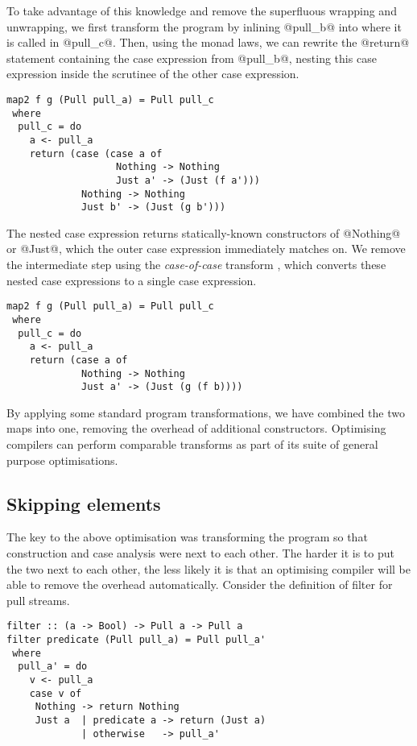 To take advantage of this knowledge and remove the superfluous wrapping and unwrapping, we first transform the program by inlining @pull_b@ into where it is called in @pull_c@.
Then, using the monad laws, we can rewrite the @return@ statement containing the case expression from @pull_b@, nesting this case expression inside the scrutinee of the other case expression.

\begin{lstlisting}
map2 f g (Pull pull_a) = Pull pull_c
 where
  pull_c = do
    a <- pull_a
    return (case (case a of
                   Nothing -> Nothing
                   Just a' -> (Just (f a')))
             Nothing -> Nothing
             Just b' -> (Just (g b')))
\end{lstlisting}

The nested case expression returns statically-known constructors of @Nothing@ or @Just@, which the outer case expression immediately matches on.
We remove the intermediate step using the \emph{case-of-case} transform \cite{jones1998transformation}, which converts these nested case expressions to a single case expression.


\begin{lstlisting}
map2 f g (Pull pull_a) = Pull pull_c
 where
  pull_c = do
    a <- pull_a
    return (case a of
             Nothing -> Nothing
             Just a' -> (Just (g (f b))))
\end{lstlisting}

By applying some standard program transformations, we have combined the two maps into one, removing the overhead of additional constructors.
Optimising compilers can perform comparable transforms as part of its suite of general purpose optimisations.

\subsection{Skipping elements}

The key to the above optimisation was transforming the program so that construction and case analysis were next to each other.
The harder it is to put the two next to each other, the less likely it is that an optimising compiler will be able to remove the overhead automatically.
Consider the definition of filter for pull streams.

\begin{lstlisting}
filter :: (a -> Bool) -> Pull a -> Pull a
filter predicate (Pull pull_a) = Pull pull_a'
 where
  pull_a' = do
    v <- pull_a
    case v of
     Nothing -> return Nothing
     Just a  | predicate a -> return (Just a)
             | otherwise   -> pull_a'
\end{lstlisting}

